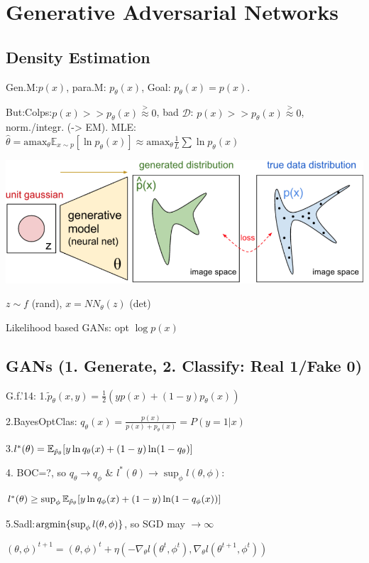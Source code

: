 \section{Generative Adversarial Networks}
\subsection*{Density Estimation}
Gen.M:$p(x)$, para.M: $p_{\theta}(x)$, Goal: $p_{\theta}(x)=p(x)$.

But:Colps:$p(x)>>p_{\theta}(x)\stackrel{>}{\approx}0$, bad $\mathcal{D}$: $p(x)>>p_{\theta}(x)\stackrel{>}{\approx}0$, norm./integr. (-> EM). MLE:$\hat{\theta}=\text{amax}_{\theta} \mathbb{E}_{x\sim p}[\ln p_{\theta}(x)]\approx \text{amax}_{\theta} \frac{1}{L}\sum\ln p_{\theta}(x)$

\includegraphics[width=\textwidth/6]{ETH-DS-2020/AML/Resources/gans.png}

$z\sim f$ (rand), $x=NN_{\theta}(z)$ (det)

Likelihood based GANs: opt $\log p(x)$ 

\subsection*{GANs (1. Generate, 2. Classify: Real 1/Fake 0)}
G.f.'14: 
1.$\tilde{p}_{\theta}(x,y)=\frac{1}{2}(y p(x)+(1-y)p_{\theta}(x))$

2.BayesOptClas: $q_{\theta}(x)=\frac{p(x)}{p(x)+p_{\theta}(x)}=P(y=1|x)$

3.$l^*(\theta)= \mathbb{E}_{\tilde{p}_{\theta}}[y\ln q_{\theta}(x)+(1-y)\ln(1-q_{\theta})]$

4. BOC=?, so $q_{\theta}\rightarrow q_{\phi}$ \& $l^*(\theta)\rightarrow \sup_{\phi} l(\theta,\phi)$:

$l^*(\theta)\ge\sup_{\phi}\mathbb{E}_{\tilde{p}_{\theta}}[y\ln q_{\phi}(x)+(1-y)\ln(1-q_{\phi}(x))]$

5.Sadl:$\operatorname*{argmin}\{\sup_{\phi} l(\theta,\phi)\}$, so SGD may $\rightarrow \infty$

$(\theta,\phi)^{t+1}=(\theta,\phi)^t+\eta(- \nabla_{\theta} l(\theta^t,\phi^t), \nabla_{\theta}l(\theta^{t+1},\phi^t))$

